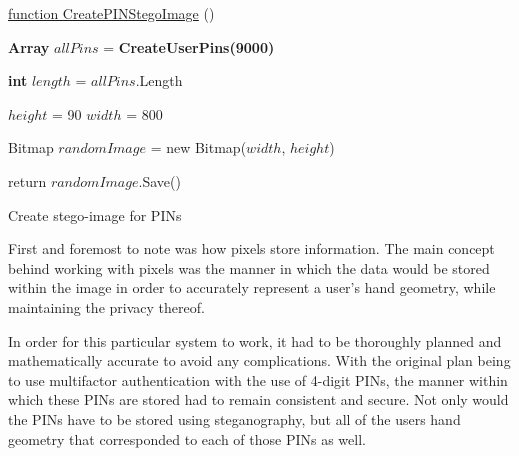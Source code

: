\begin{algorithm}
     
     \underline{function CreatePINStegoImage} ()\;
     
     \textbf{Array} $allPins$ = \textbf{CreateUserPins(9000)}\;
     
     
     \textbf{int} $length$ = $allPins$.Length\;
     
     $height$ = 90\;
     $width$ = 800\;
     
     Bitmap $randomImage$ = new Bitmap($width$, $height$)\;
     
     
     return $randomImage$.Save()\;
     
     \caption{Create stego-image for PINs}
     \label{alg: Create stego-image for PINs}
\end{algorithm}

First and foremost to note was how pixels store information. The main concept behind working with pixels was the manner in which the data would be stored within the image in order to accurately represent a user’s hand geometry, while maintaining the privacy thereof. 

In order for this particular system to work, it had to be thoroughly planned and mathematically accurate to avoid any complications. With the original plan being to use multifactor authentication with the use of 4-digit PINs, the manner within which these PINs are stored had to remain consistent and secure. Not only would the PINs have to be stored using steganography, but all of the users hand geometry that corresponded to each of those PINs as well. 

